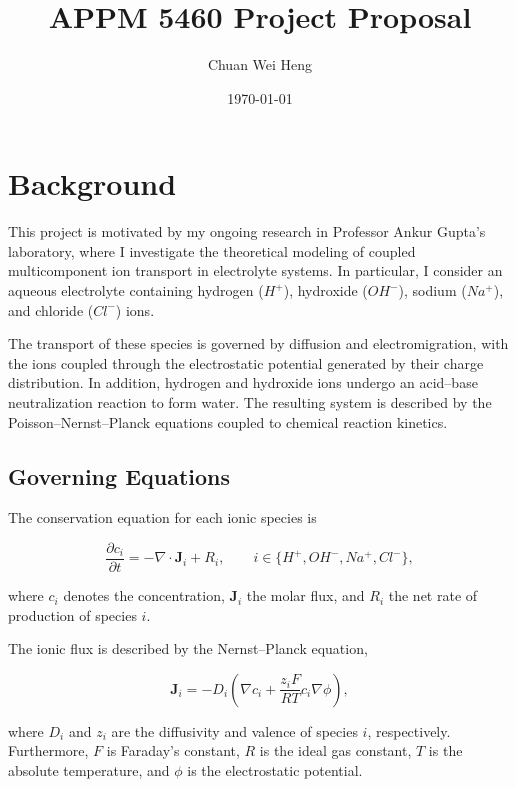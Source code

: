 \documentclass[11pt]{article}
\title{APPM 5460 Project Proposal}
\author{Chuan Wei Heng}
\date{\today}
\begin{document}
\maketitle

\section{Background}

This project is motivated by my ongoing research in
Professor Ankur Gupta's laboratory, where I investigate
the theoretical modeling of coupled multicomponent ion
transport in electrolyte systems. In particular, I
consider an aqueous electrolyte containing hydrogen
($H^+$), hydroxide ($OH^-$), sodium ($Na^+$), and
chloride ($Cl^-$) ions.

The transport of these species is governed by diffusion
and electromigration, with the ions coupled through
the electrostatic potential generated by their charge
distribution. In addition, hydrogen and hydroxide ions
undergo an acid--base neutralization reaction to form
water. The resulting system is described by the
Poisson--Nernst--Planck equations coupled to chemical
reaction kinetics.

\subsection*{Governing Equations}

The conservation equation for each ionic species is

\begin{equation}
    \frac{\partial c_i}{\partial t}
    = -\nabla\cdot\bm{J}_i + R_i,
    \qquad
    i \in \{H^+, OH^-, Na^+, Cl^-\},
    \label{eq:continuity}
\end{equation}

where $c_i$ denotes the concentration, $\bm{J}_i$
the molar flux, and $R_i$ the net rate of production
of species $i$.

The ionic flux is described by the Nernst--Planck
equation,

\begin{equation}
    \bm{J}_i
    = -D_i\left(
        \nabla c_i
        + \frac{z_i F}{RT}c_i\nabla\phi
    \right),
    \label{eq:nernst_planck}
\end{equation}

where $D_i$ and $z_i$ are the diffusivity and valence
of species $i$, respectively. Furthermore, $F$ is
Faraday's constant, $R$ is the ideal gas constant,
$T$ is the absolute temperature, and $\phi$ is the
electrostatic potential.
\end{document}
